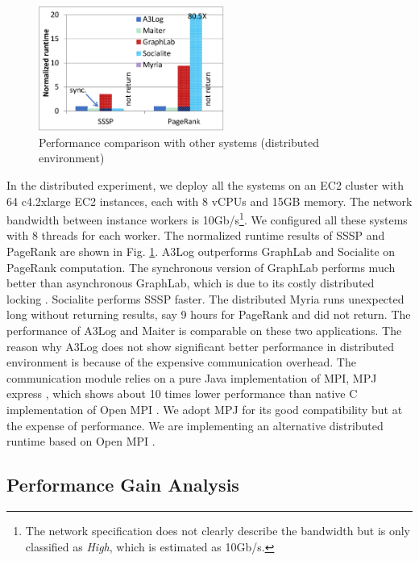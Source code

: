 \documentclass{vldb}
\begin{document}
\begin{figure}[!t]
	\vspace{0.0in}
	\centering
	\includegraphics[width=2.4in]{fig/dist-result}
	\vspace{-0.1in}
	\caption{Performance comparison with other systems (distributed environment)}
	\label{fig:dist-result}
	\vspace{-0.2in}
\end{figure}

In the distributed experiment, we deploy all the systems on an EC2 cluster with 64 c4.2xlarge EC2 instances, each with 8 vCPUs and 15GB memory. The network bandwidth between instance workers is 10Gb/s\footnote{The network specification does not clearly describe the bandwidth but is only classified as \emph{High}, which is estimated as 10Gb/s.}. We configured all these systems with 8 threads for each worker. The normalized runtime results of SSSP and PageRank are shown in Fig. \ref{fig:dist-result}. A3Log outperforms GraphLab and Socialite on PageRank computation. The synchronous version of GraphLab performs much better than asynchronous GraphLab, which is due to its costly distributed locking \cite{Han:2015:GUB:2777598.2777604,Low:2012:DGF:2212351.2212354}. Socialite performs SSSP faster. The distributed Myria runs unexpected long without returning results, say 9 hours for PageRank and did not return. The performance of A3Log and Maiter is comparable on these two applications. The reason why A3Log does not show significant better performance in distributed environment is because of the expensive communication overhead. The communication module relies on a pure Java implementation of MPI, MPJ express \cite{mpich}, which shows about 10 times lower performance than native C implementation of Open MPI \cite{mpjperformance}. We adopt MPJ for its good compatibility but at the expense of performance. We are implementing an alternative distributed runtime based on Open MPI \cite{openmpi}.

\subsection{Performance Gain Analysis}
\label{sec:expr:optimizations}
\end{document}
